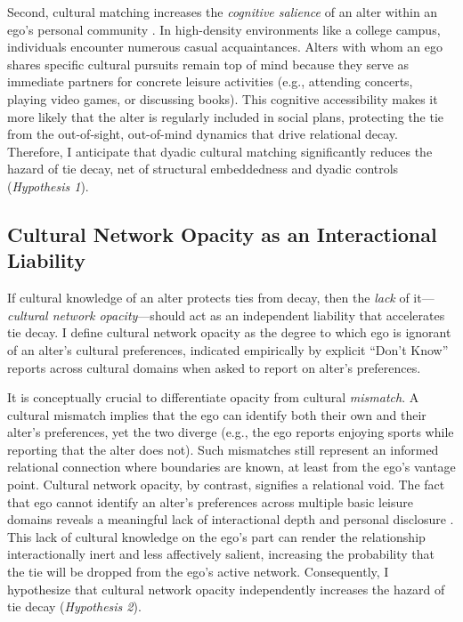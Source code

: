 \documentclass[12pt,letterpaper]{article}
\begin{document}
Second, cultural matching increases the \textit{cognitive salience} of an alter within an ego's personal community \citep{dimaggio1987, burt2002}. In high-density environments like a college campus, individuals encounter numerous casual acquaintances. Alters with whom an ego shares specific cultural pursuits remain top of mind because they serve as immediate partners for concrete leisure activities (e.g., attending concerts, playing video games, or discussing books). This cognitive accessibility makes it more likely that the alter is regularly included in social plans, protecting the tie from the out-of-sight, out-of-mind dynamics that drive relational decay. Therefore, I anticipate that dyadic cultural matching significantly reduces the hazard of tie decay, net of structural embeddedness and dyadic controls (\textit{Hypothesis 1}).

\subsection{Cultural Network Opacity as an Interactional Liability}\label{cultural-network-opacity}

If cultural knowledge of an alter protects ties from decay, then the \textit{lack} of it---\textit{cultural network opacity}---should act as an independent liability that accelerates tie decay. I define cultural network opacity as the degree to which ego is ignorant of an alter's cultural preferences, indicated empirically by explicit ``Don't Know'' reports across cultural domains when asked to report on alter's preferences. 

It is conceptually crucial to differentiate opacity from cultural \textit{mismatch}. A cultural mismatch implies that the ego can identify both their own and their alter's preferences, yet the two diverge (e.g., the ego reports enjoying sports while reporting that the alter does not). Such mismatches still represent an informed relational connection where boundaries are known, at least from the ego's vantage point. Cultural network opacity, by contrast, signifies a relational void. The fact that ego cannot identify an alter's preferences across multiple basic leisure domains reveals a meaningful lack of interactional depth and personal disclosure \citep{wellman1997}. This lack of cultural knowledge on the ego's part can render the relationship interactionally inert and less affectively salient, increasing the probability that the tie will be dropped from the ego's active network. Consequently, I hypothesize that cultural network opacity independently increases the hazard of tie decay (\textit{Hypothesis 2}).
\end{document}
